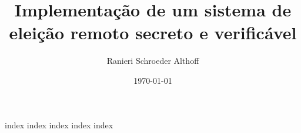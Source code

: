 \documentclass[
   	a5paper,
	twoside,
    english,
    brazil,
	chapter=TITLE,
	section=TITLE,
]{abntex2}
\title{Implementação de um sistema de eleição remoto secreto e verificável}
\author{Ranieri Schroeder Althoff}
\date{\today}
\begin{document}
\sffamily

\pretextual



\textual

{index}
{index}
{index}
{index}
{index}

\printbibliography
\end{document}
